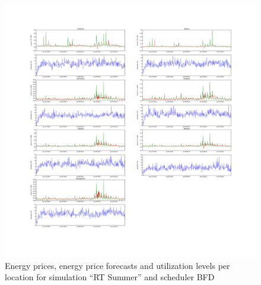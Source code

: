 \begin{figure}[htbp]
	\centering
	\vspace*{-0.6in}
	\hspace*{-1.4in}
		\includegraphics[width=1.60\textwidth]{figures/appendix_simulation_results/RT_Summer_scenario_1.pdf}
	\vspace*{-1.0in}
	\caption{Energy prices, energy price forecasts and utilization levels per location for simulation ``RT Summer'' and scheduler BFD}
	\label{fig:app_RT_Summer_scenario_1}
\end{figure}

